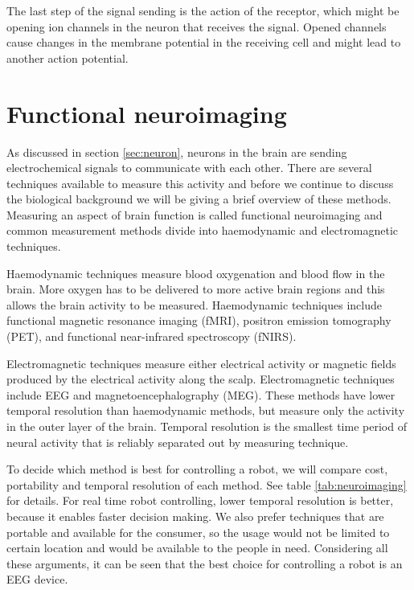 The last step of the signal sending is the action of the receptor, which might be opening ion channels in the neuron that receives the signal. Opened channels cause changes in the membrane potential in the receiving cell and might lead to another action potential.

\section{Functional neuroimaging}
\label{sec:neuroimaging}

As discussed in section \ref{sec:neuron}, neurons in the brain are sending electrochemical signals to communicate with each other. There are several techniques available to measure this activity and before we continue to discuss the biological background we will be giving a brief overview of these methods. Measuring an aspect of brain function is called functional neuroimaging and common measurement methods divide into haemodynamic and electromagnetic techniques.

Haemodynamic techniques measure blood oxygenation and blood flow in the brain. More oxygen has to be delivered to more active brain regions and this allows the brain activity to be measured. Haemodynamic techniques include functional magnetic resonance imaging (fMRI), positron emission tomography (PET), and functional near-infrared spectroscopy (fNIRS).

Electromagnetic techniques measure either electrical activity or magnetic fields produced by the electrical activity along the scalp. Electromagnetic techniques include \acrfull{EEG} and magnetoencephalography (MEG). These methods have lower temporal resolution than haemodynamic methods, but measure only the activity in the outer layer of the brain. Temporal resolution is the smallest time period of neural activity that is reliably separated out by measuring technique.

To decide which method is best for controlling a robot, we will compare cost, portability and temporal resolution of each method. See table \ref{tab:neuroimaging} for details. For real time robot controlling, lower temporal resolution is better, because it enables faster decision making. We also prefer techniques that are portable and available for the consumer, so the usage would not be limited to certain location and would be available to the people in need. Considering all these arguments, it can be seen that the best choice for controlling a robot is an \acrshort{EEG} device.

